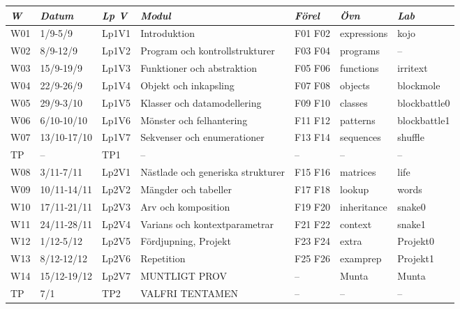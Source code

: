 \begin{tabular}{l|l|l|l|l|l|l}
\textit{W} & \textit{Datum} & \textit{Lp V} & \textit{Modul} & \textit{Förel} & \textit{Övn} & \textit{Lab} \\ \hline \hline
W01 & 1/9-5/9 & Lp1V1 & Introduktion & F01 F02 & expressions & kojo \\
W02 & 8/9-12/9 & Lp1V2 & Program och kontrollstrukturer & F03 F04 & programs & -- \\
W03 & 15/9-19/9 & Lp1V3 & Funktioner och abstraktion & F05 F06 & functions & irritext \\
W04 & 22/9-26/9 & Lp1V4 & Objekt och inkapsling & F07 F08 & objects & blockmole \\
W05 & 29/9-3/10 & Lp1V5 & Klasser och datamodellering & F09 F10 & classes & blockbattle0 \\
W06 & 6/10-10/10 & Lp1V6 & Mönster och felhantering & F11 F12 & patterns & blockbattle1 \\
W07 & 13/10-17/10 & Lp1V7 & Sekvenser och enumerationer & F13 F14 & sequences & shuffle \\
TP & -- & TP1 & -- & -- & -- & -- \\
W08 & 3/11-7/11 & Lp2V1 & Nästlade och generiska strukturer & F15 F16 & matrices & life \\
W09 & 10/11-14/11 & Lp2V2 & Mängder och tabeller & F17 F18 & lookup & words \\
W10 & 17/11-21/11 & Lp2V3 & Arv och komposition & F19 F20 & inheritance & snake0 \\
W11 & 24/11-28/11 & Lp2V4 & Varians och kontextparametrar & F21 F22 & context & snake1 \\
W12 & 1/12-5/12 & Lp2V5 & Fördjupning, Projekt & F23 F24 & extra & Projekt0 \\
W13 & 8/12-12/12 & Lp2V6 & Repetition & F25 F26 & examprep & Projekt1 \\
W14 & 15/12-19/12 & Lp2V7 & MUNTLIGT PROV & -- & Munta & Munta \\
TP & 7/1 & TP2 & VALFRI TENTAMEN & -- & -- & -- \\
\end{tabular}
